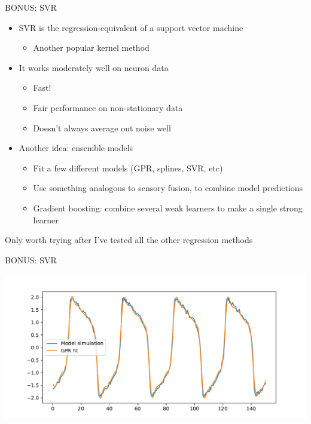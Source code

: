 \documentclass[presentation]{beamer}
\begin{document}
\begin{frame}[label={sec:org03b9887}]{BONUS: SVR}
\begin{itemize}[<+->]
\item SVR is the regression-equivalent of a support vector machine
\begin{itemize}
\item Another popular kernel method
\end{itemize}
\item It works moderately well on neuron data
\begin{itemize}
\item Fast!
\item Fair performance on non-stationary data
\item Doesn't always average out noise well
\end{itemize}
\item Another idea: ensemble models
\begin{itemize}
\item Fit a few different models (GPR, splines, SVR, etc)
\item Use something analogous to sensory fusion, to combine model predictions
\item Gradient boosting: combine several weak learners to make a single strong learner
\end{itemize}
\end{itemize}

Only worth trying after I've tested all the other regression methods
\end{frame}

\begin{frame}[label={sec:org779d04b}]{BONUS: SVR}
\begin{center}
\includegraphics[width=\textwidth]{./SVR.pdf}
\end{center}
\end{frame}
\end{document}
